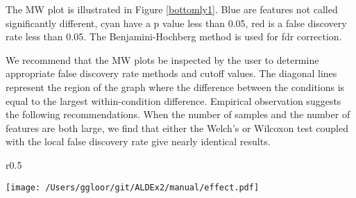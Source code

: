 \documentclass[11pt]{amsart}
\begin{document}
The MW plot is illustrated in Figure \ref{bottomly1}. Blue are features not called significantly different, cyan have a p value less than 0.05, red is a false discovery rate less than 0.05. The Benjamini-Hochberg method is used for fdr correction\cite{benjamini:1995}.


We recommend that the MW plots  be inspected by the user to determine appropriate false discovery rate methods and cutoff values. The diagonal lines represent the region of the graph where the difference between the conditions is equal to the largest within-condition difference\cite{fernandes:2013}. Empirical observation suggests the following recommendations. When the number of samples and the number of features are both large, we find that either the Welch's or Wilcoxon test coupled with the local false discovery rate give nearly identical results. 
\begin{wrapfigure}{r}{0.5\textwidth}\vspace{-1cm}
\vspace{-.5cm}
\begin{center}
\texttt{[image: /Users/ggloor/git/ALDEx2/manual/effect.pdf]}
\caption{Plot showing correlation between effect size and p values. }
\label{bottomly1}
\end{center}\vspace{-.5cm}
\end{wrapfigure}
\end{document}
